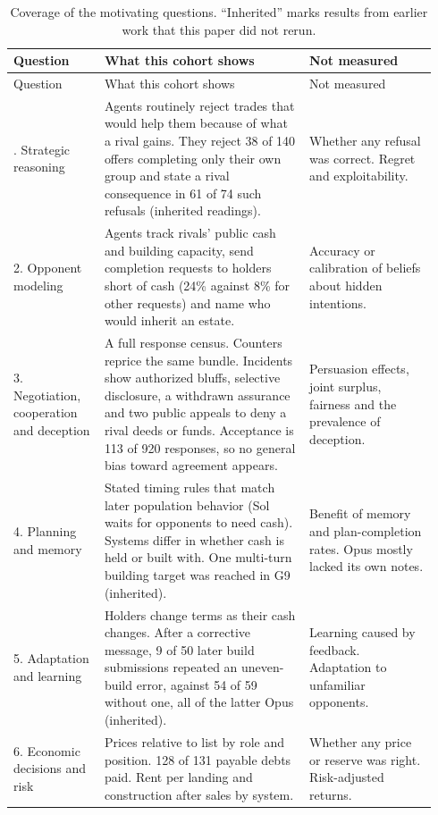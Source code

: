 \begingroup\footnotesize
\renewcommand{\arraystretch}{1.12}
\begin{longtable}{@{}L{0.20\linewidth}L{0.45\linewidth}L{0.29\linewidth}@{}}
\caption{Coverage of the motivating questions. ``Inherited'' marks results from earlier work that this paper did not rerun.}\label{tab:questions}\\
\toprule
Question & What this cohort shows & Not measured\\
\midrule\endfirsthead
\toprule
Question & What this cohort shows & Not measured\\
\midrule\endhead
\bottomrule{}. Strategic reasoning & Agents routinely reject trades that would help them because of what a rival gains. They reject 38 of 140 offers completing only their own group and state a rival consequence in 61 of 74 such refusals (inherited readings). & Whether any refusal was correct. Regret and exploitability.\\
2. Opponent modeling & Agents track rivals' public cash and building capacity, send completion requests to holders short of cash (24\% against 8\% for other requests) and name who would inherit an estate. & Accuracy or calibration of beliefs about hidden intentions.\\
3. Negotiation, cooperation and deception & A full response census. Counters reprice the same bundle. Incidents show authorized bluffs, selective disclosure, a withdrawn assurance and two public appeals to deny a rival deeds or funds. Acceptance is 113 of 920 responses, so no general bias toward agreement appears. & Persuasion effects, joint surplus, fairness and the prevalence of deception.\\
4. Planning and memory & Stated timing rules that match later population behavior (Sol waits for opponents to need cash). Systems differ in whether cash is held or built with. One multi-turn building target was reached in G9 (inherited). & Benefit of memory and plan-completion rates. Opus mostly lacked its own notes.\\
5. Adaptation and learning & Holders change terms as their cash changes. After a corrective message, 9 of 50 later build submissions repeated an uneven-build error, against 54 of 59 without one, all of the latter Opus (inherited). & Learning caused by feedback. Adaptation to unfamiliar opponents.\\
6. Economic decisions and risk & Prices relative to list by role and position. 128 of 131 payable debts paid. Rent per landing and construction after sales by system. & Whether any price or reserve was right. Risk-adjusted returns.\\

\end{longtable}
